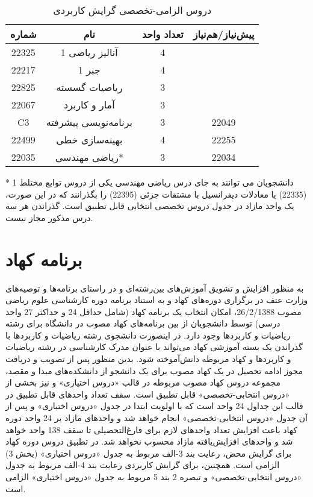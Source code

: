 \documentclass{article}
\begin{document}
\begin{table}[H]
\begin{center}
\begin{tabular}{|c|c|c|c|}
	\hline
	شماره & نام & تعداد واحد & پیش‌نیاز/هم‌نیاز \\
	\hline
	22325 & آنالیز ریاضی 1 & 4 &  \\
	\hline
	22217 & جبر 1 & 4 &  \\
	\hline
	22825 & ریاضیات گسسته & 3 &  \\
	\hline
	22067 & آمار و کاربرد & 3 &  \\
	\hline
	C3 & برنامه‌نویسی پیشرفته & 3 & 22049 \\
	\hline
	22499 & بهینه‌سازی خطی  & 4 & 22255 \\
	\hline
	22035 & ریاضی مهندسی* & 3 & 22034 \\
        \hline
    \end{tabular}
    \caption{\label{math-t3-2}
     دروس الزامی-تخصصی گرایش کاربردی
    }
    \end{center}
    \end{table}
* دانشجویان می توانند به جای درس ریاضی مهندسی یکی از دروس توابع مختلط 1 (22335) یا معادلات دیفرانسیل با مشتقات جزئی (22395) را بگذرانند که در این صورت، یک واحد مازاد در جدول دروس تخصصی انتخابی قابل تطبیق است. گذراندن هر سه درس مذکور مجاز نیست.

\pagebreak

\section{برنامه کهاد}
به منظور افزایش و تشویق آموزش‌های بین‌رشته‌ای و در راستای برنامه‌ها و توصیه‌های وزارت عتف در برگزاری دوره‌های کهاد و به استناد برنامه دوره کارشناسی علوم ریاضی مصوب 26/2/1388، امکان انتخاب یک برنامه کهاد (شامل حداقل 24 و حداکثر 27 واحد درسی) توسط دانشجویان از بین برنامه‌های کهاد مصوب در دانشگاه برای رشته ریاضیات و کاربردها وجود دارد. در اینصورت دانشجوی  رشته ریاضیات و کاربردها با گذراندن یک بسته آموزشی کهاد می‌تواند با عنوان مدرک کارشناسی در رشته ریاضیات و کاربردها و کهاد مربوطه دانش‌آموخته شود. بدین منظور پس از تصویب و دریافت مجوز ادامه تحصیل در یک کهاد مصوب برای یک دانشجو از دانشکده‌های مبدا و مقصد، مجموعه دروس کهاد مصوب مربوطه در قالب «دروس اختیاری» و نیز بخشی از «دروس انتخابی-تخصصی» قابل تطبیق است. سقف تعداد واحدهای قابل تطبیق در قالب این جداول 24 واحد است که با اولویت ابتدا در جدول «دروس اختیاری» و پس از آن جدول «دروس انتخابی-تخصصی» انجام خواهد شد و واحدهای مازاد بر 24 واحد دوره کهاد باعث افزایش تعداد واحدهای لازم برای فارغ‌التحصیلی تا سقف 138 واحد خواهد شد و واحدهای افزایش‌یافته مازاد محسوب نخواهد شد. در تطبیق دروس دوره کهاد برای گرایش محض، رعایت بند 3-الف مربوط به جدول «دروس اختیاری» (بخش 3) الزامی است. همچنین، برای گرایش کاربردی رعایت بند 4-الف مربوط به جدول «دروس انتخابی-تخصصی» و تبصره 2 بند 5 مربوط به جدول «دروس اختیاری» الزامی است.
\end{document}

